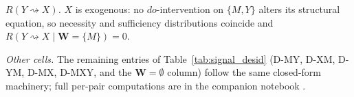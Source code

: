 \textit{$R(Y \rightsquigarrow X)$.}
$X$ is exogenous: no $do$-intervention on $\{M, Y\}$ alters its structural
equation, so necessity and sufficiency distributions coincide and
$R(Y \rightsquigarrow X \mid \mathbf{W}{=}\{M\}) = 0$.

\textit{Other cells.}
The remaining entries of Table~\ref{tab:signal_desid} (D-MY, D-XM, D-YM, D-MX,
D-MXY, and the $\mathbf{W} = \emptyset$ column) follow the same closed-form
machinery; full per-pair computations are in the companion notebook
.

